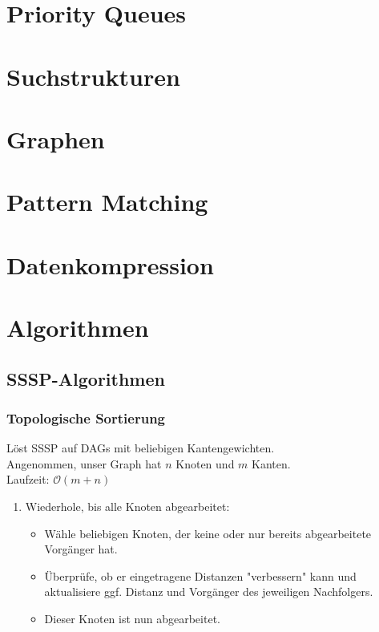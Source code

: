 \documentclass[12pt,a4paper]{article}
\begin{document}
\section{Priority Queues}
\section{Suchstrukturen}
\section{Graphen}
\section{Pattern Matching}
\section{Datenkompression}
\section{Algorithmen}
\subsection{SSSP-Algorithmen}
\subsubsection{Topologische Sortierung}
Löst SSSP auf DAGs mit beliebigen Kantengewichten.\\
Angenommen, unser Graph hat $n$ Knoten und $m$ Kanten.\\
Laufzeit: $\mathcal{O}(m+n)$\\
\begin{enumerate}
\item Wiederhole, bis alle Knoten abgearbeitet: \begin{itemize}
\item Wähle beliebigen Knoten, der keine oder nur bereits abgearbeitete Vorgänger hat.
\item Überprüfe, ob er eingetragene Distanzen "verbessern"  kann und aktualisiere ggf. Distanz und Vorgänger des jeweiligen Nachfolgers.
\item Dieser Knoten ist nun abgearbeitet.
\end{itemize}
\end{enumerate}
\end{document}
